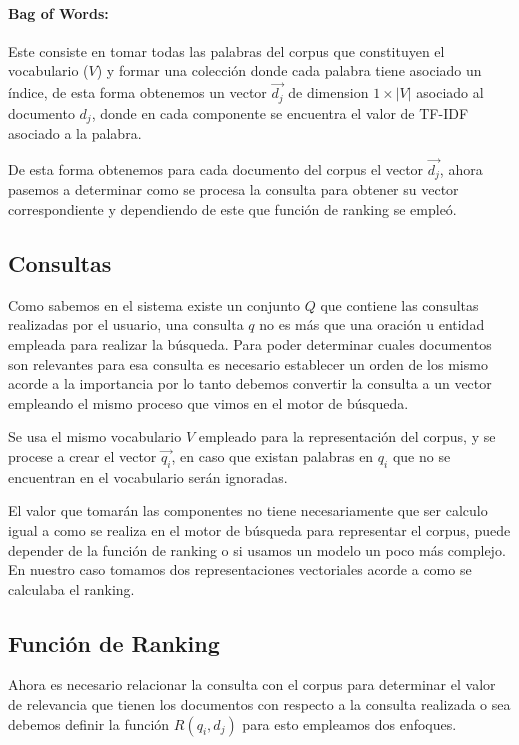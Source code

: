 \documentclass[runningheads,a4paper]{llncs}
\begin{document}
\paragraph*{Bag of Words:} Este consiste en tomar todas las palabras del corpus que constituyen el vocabulario ($V$) y formar una colección donde cada palabra tiene asociado un índice, de esta forma obtenemos un vector $\overrightarrow{d_j}$ de dimension $1 \times |V|$ asociado al documento $d_j$, donde en cada componente se encuentra el valor de TF-IDF asociado a la palabra.

De esta forma obtenemos para cada documento del corpus el vector $\overrightarrow{d_j}$, ahora pasemos a determinar como se procesa la consulta para obtener su vector correspondiente y dependiendo de este que función de ranking se empleó.

\subsection*{Consultas}

Como sabemos en el sistema existe un conjunto $Q$ que contiene las consultas realizadas por el usuario, una consulta $q$ no es más que una oración u entidad empleada para realizar la búsqueda. Para poder determinar cuales documentos son relevantes para esa consulta es necesario establecer un orden de los mismo acorde a la importancia por lo tanto debemos convertir la consulta a un vector empleando el mismo proceso que vimos en el motor de búsqueda.

Se usa el mismo vocabulario $V$ empleado para la representación del corpus, y se procese a crear el vector $\overrightarrow{q_i}$, en caso que existan palabras en $q_i$ que no se encuentran en el vocabulario serán ignoradas. 

El valor que tomarán las componentes no tiene necesariamente que ser calculo igual a como se realiza en el motor de búsqueda para representar el corpus, puede depender de la función de ranking o si usamos un modelo un poco más complejo. En nuestro caso tomamos dos representaciones vectoriales acorde a como se calculaba el ranking.

\subsection*{Función de Ranking} 

Ahora es necesario relacionar la consulta con el corpus para determinar el valor de relevancia que tienen los documentos con respecto a la consulta realizada o sea debemos definir la función $R(q_i, d_j)$ para esto empleamos dos enfoques.
\end{document}
